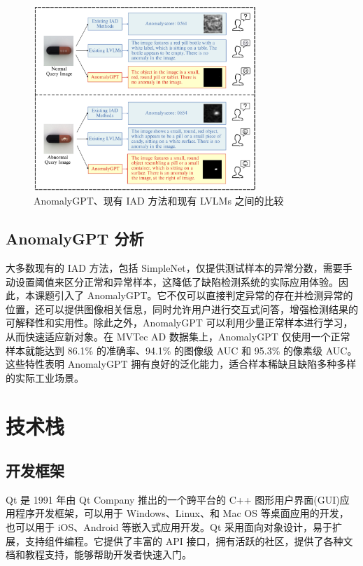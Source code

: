 \documentclass[
  ]{njuthesis}
\begin{document}
\begin{figure}[ht]
    \centering
    \includegraphics[width=0.75\textwidth]{images/AnomalyGPT、IAD、LVLMs比较图.png}
    \caption{AnomalyGPT、现有 IAD 方法和现有 LVLMs 之间的比较}
    \label{AnomalyGPT比较图}
\end{figure}


\subsection{AnomalyGPT 分析}

大多数现有的 IAD 方法，包括 SimpleNet，仅提供测试样本的异常分数，需要手动设置阈值来区分正常和异常样本，这降低了缺陷检测系统的实际应用体验。因此，本课题引入了 AnomalyGPT。它不仅可以直接判定异常的存在并检测异常的位置，还可以提供图像相关信息，同时允许用户进行交互式问答，增强检测结果的可解释性和实用性。除此之外，AnomalyGPT 可以利用少量正常样本进行学习，从而快速适应新对象。在 MVTec AD 数据集上，AnomalyGPT 仅使用一个正常样本就能达到 86.1\% 的准确率、94.1\% 的图像级 AUC 和 95.3\% 的像素级 AUC。这些特性表明 AnomalyGPT 拥有良好的泛化能力，适合样本稀缺且缺陷多种多样的实际工业场景。

\section{技术栈}

\subsection{开发框架}

Qt 是 1991 年由 Qt Company 推出的一个跨平台的 C++ 图形用户界面(GUI)应用程序开发框架，可以用于 Windows、Linux、和 Mac OS 等桌面应用的开发，也可以用于 iOS、Android 等嵌入式应用开发。Qt 采用面向对象设计，易于扩展，支持组件编程。它提供了丰富的 API 接口，拥有活跃的社区，提供了各种文档和教程支持，能够帮助开发者快速入门。
\end{document}
